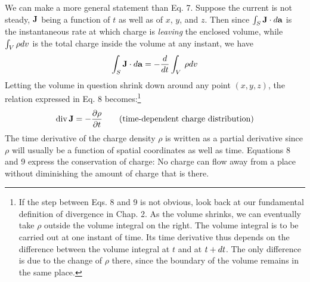 We can make a more general statement than Eq. 7. Suppose the
current is not steady, $\mathbf{J}$ being a function of $t$ as well as of $x$, $y$, and $z$.
Then since $\int_S \mathbf{J}\cdot d\mathbf{a}$ is the instantaneous rate at which charge is
\emph{leaving} the enclosed volume, while $\int_V\rho d v$ is the total charge inside
the volume at any instant, we have
\begin{equation}
  \int_S \mathbf{J}\cdot d\mathbf{a} = -\frac{d}{d t} \int_V\:\rho d v
\end{equation}
Letting the volume in question shrink down around any point
$(x,y,z)$, the relation expressed in Eq. 8 becomes:\footnote{If
the step between Eqs. 8 and 9 is not obvious, look back at our fundamental definition
of divergence in Chap. 2. As the volume shrinks, we can eventually take $\rho$ outside
the volume integral on the right. The volume integral is to be carried out at one instant
of time. Its time derivative thus depends on the difference between the volume integral
at $t$ and at $t + d t$. The only difference is due to the change of $\rho$ there, since the boundary
of the volume remains in the same place.}
\begin{equation}
  \operatorname{div}\mathbf{J}=-\frac{\partial\rho}{\partial t} \qquad \text{(time-dependent charge distribution)}
\end{equation}
The time derivative of the charge density $\rho$ is written as a partial
derivative since $\rho$ will usually be a function of spatial coordinates as
well as time. Equations 8 and 9 express the conservation of charge:
No charge can flow away from a place without diminishing the
amount of charge that is there.


